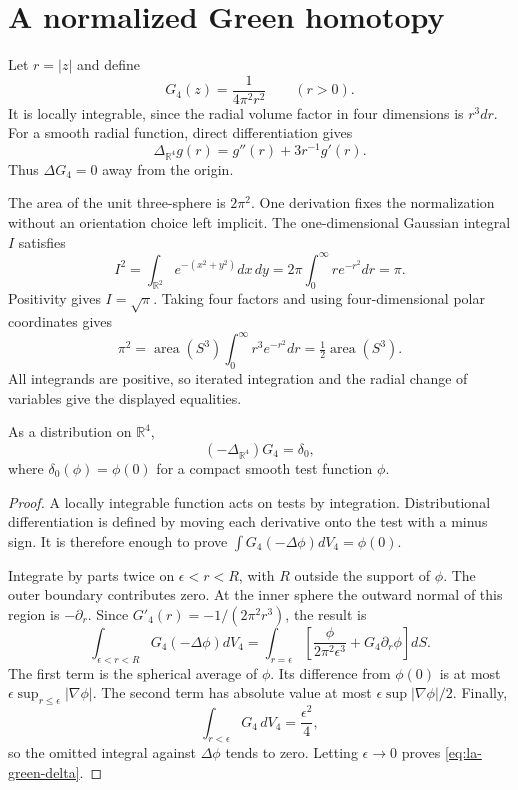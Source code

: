 \section{A normalized Green homotopy}
\label{sec:la-green}

Let $r=|z|$ and define
\begin{equation}\label{eq:la-green-function}
 G_4(z)=\frac1{4\pi^2r^2}\qquad(r>0).
\end{equation}
It is locally integrable, since the radial volume factor in
four dimensions is $r^3dr$. For a smooth radial function,
direct differentiation gives
\[
 \Delta_{\mathbb R^4}g(r)=g''(r)+3r^{-1}g'(r).
\]
Thus $\Delta G_4=0$ away from the origin.

The area of the unit three-sphere is $2\pi^2$. One derivation
fixes the normalization without an orientation choice left
implicit. The one-dimensional Gaussian integral $I$ satisfies
\[
 I^2=\int_{\mathbb R^2}e^{-(x^2+y^2)}dx\,dy
       =2\pi\int_0^\infty re^{-r^2}dr=\pi.
\]
Positivity gives $I=\sqrt\pi$. Taking four factors and using
four-dimensional polar coordinates gives
\[
 \pi^2=\operatorname{area}(S^3)
              \int_0^\infty r^3e^{-r^2}dr
         =\tfrac12\operatorname{area}(S^3).
\]
All integrands are positive, so iterated integration and the
radial change of variables give the displayed equalities.

\begin{lemma}\label{lem:la-green-delta}
As a distribution on $\mathbb R^4$,
\begin{equation}\label{eq:la-green-delta}
 (-\Delta_{\mathbb R^4})G_4=\delta_0,
\end{equation}
where $\delta_0(\phi)=\phi(0)$ for a compact smooth test
function $\phi$.
\end{lemma}
\begin{proof}
A locally integrable function acts on tests by integration.
Distributional differentiation is defined by moving each
derivative onto the test with a minus sign. It is therefore
enough to prove $\int G_4(-\Delta\phi)dV_4=\phi(0)$.

Integrate by parts twice on $\epsilon<r<R$, with $R$ outside
the support of $\phi$. The outer boundary contributes zero.
At the inner sphere the outward normal of this region is
$-\partial_r$. Since $G'_4(r)=-1/(2\pi^2r^3)$, the result is
\[
 \int_{\epsilon<r<R}G_4(-\Delta\phi)dV_4
 =\int_{r=\epsilon}
     \left[\frac{\phi}{2\pi^2\epsilon^3}
                  +G_4\partial_r\phi\right]dS.
\]
The first term is the spherical average of $\phi$. Its
difference from $\phi(0)$ is at most
$\epsilon\sup_{r\leq\epsilon}|\nabla\phi|$.
The second term has absolute value at most
$\epsilon\sup|\nabla\phi|/2$.
Finally,
\[
 \int_{r<\epsilon}G_4\,dV_4=\frac{\epsilon^2}{4},
\]
so the omitted integral against $\Delta\phi$ tends to zero.
Letting $\epsilon\to0$ proves \eqref{eq:la-green-delta}.
\end{proof}

